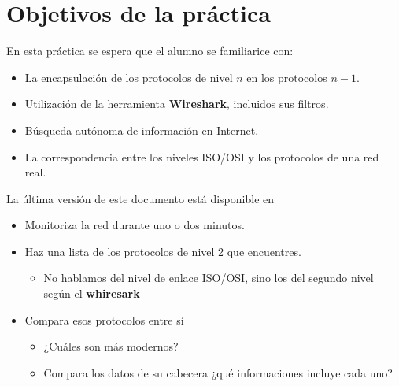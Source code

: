 

\renewcommand{\hmwkTitle}{Análisis de tráfico con \textbf{Wireshark}}

\renewcommand{\hmwkClass}{Plan. y Admin. de Redes}




\primerapagina


\section{Objetivos de la práctica}
En esta práctica se espera que el alumno se familiarice con:
\begin{itemize}
\item La encapsulación de los protocolos de nivel $n$ en los protocolos $n-1$.
\item Utilización de la herramienta \textbf{Wireshark}, incluidos sus filtros.
\item Búsqueda autónoma de información en Internet.
\item La correspondencia entre los niveles ISO/OSI y los protocolos de una red real.
  
\end{itemize}

La última versión de este documento está disponible en 

\begin{homeworkProblem}

  \begin{itemize}
  \item Monitoriza la red durante uno o dos minutos. 
  \item Haz una lista de los protocolos de nivel 2 que encuentres.
    \begin{itemize}
    \item \small{No hablamos del nivel de enlace ISO/OSI, sino los del segundo nivel según el \textbf{whiresark}}
    \end{itemize}
  \item Compara esos protocolos entre sí
    \begin{itemize}
    \item ¿Cuáles son más modernos?
    \item Compara los datos de su cabecera ¿qué informaciones incluye cada uno?
    \end{itemize}
  \end{itemize}
  
\end{homeworkProblem}

